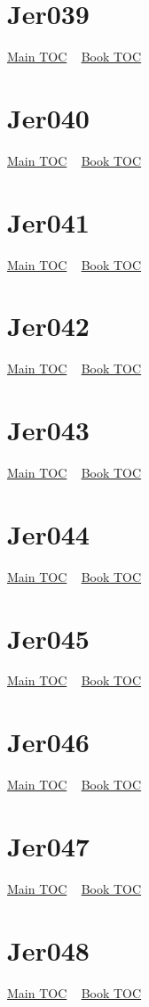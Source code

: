 \documentclass{book}
\begin{document}
  \section{Jer039}\hyperlink{toc}{Main TOC} ~ \hyperref[subsec:Jer]{Book TOC} 
  \section{Jer040}\hyperlink{toc}{Main TOC} ~ \hyperref[subsec:Jer]{Book TOC} 
  \section{Jer041}\hyperlink{toc}{Main TOC} ~ \hyperref[subsec:Jer]{Book TOC} 
  \section{Jer042}\hyperlink{toc}{Main TOC} ~ \hyperref[subsec:Jer]{Book TOC} 
  \section{Jer043}\hyperlink{toc}{Main TOC} ~ \hyperref[subsec:Jer]{Book TOC} 
  \section{Jer044}\hyperlink{toc}{Main TOC} ~ \hyperref[subsec:Jer]{Book TOC} 
  \section{Jer045}\hyperlink{toc}{Main TOC} ~ \hyperref[subsec:Jer]{Book TOC} 
  \section{Jer046}\hyperlink{toc}{Main TOC} ~ \hyperref[subsec:Jer]{Book TOC} 
  \section{Jer047}\hyperlink{toc}{Main TOC} ~ \hyperref[subsec:Jer]{Book TOC} 
  \section{Jer048}\hyperlink{toc}{Main TOC} ~ \hyperref[subsec:Jer]{Book TOC} 
\end{document}

